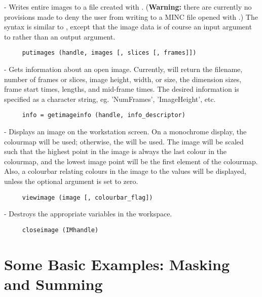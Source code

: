 \begin{description}
\item {} - Writes entire images to a file created with
.  ({\bf Warning:} there are currently no provisions
made to deny the user from writing to a MINC file opened with
.)  The syntax is similar to , except
that the image data is of course an input argument to 
rather than an output argument.
\begin{verbatim}
     putimages (handle, images [, slices [, frames]])
\end{verbatim}

\item {} - Gets information about an open image.
Currently,  will return the filename, number of
frames or slices, image height, width, or size, the dimension sizes,
frame start times, lengths, and mid-frame times.  The desired
information is specified as a character string, eg. 'NumFrames',
'ImageHeight', etc.
\begin{verbatim}
     info = getimageinfo (handle, info_descriptor)
\end{verbatim}

\item {} - Displays an image on the workstation screen.
On a monochrome display, the  colourmap will be used;
otherwise, the  will be used.  The image will be scaled
such that the highest point in the image is always the last colour in
the colourmap, and the lowest image point will be the first element of
the colourmap.  Also, a colourbar relating colours in the image to the
values will be displayed, unless the optional 
argument is set to zero.

\begin{verbatim}
     viewimage (image [, colourbar_flag])
\end{verbatim}

\item {} - Destroys the appropriate variables in the workspace.
\begin{verbatim}
     closeimage (IMhandle)
\end{verbatim}

\end{description}

\section{Some Basic Examples: Masking and Summing}
\label{simple_example}

